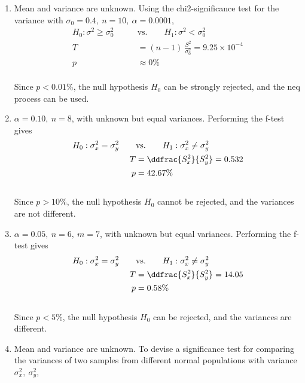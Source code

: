 \begin{enumerate}
	\item Mean and variance are unknown. Using the chi2-significance test for the variance with $ \sigma_0 = 0.4,\ n = 10,\ \alpha = 0.0001 $, \\
	
	\begin{align}
		H_0 : \sigma^2 \geq \sigma_0^2 \qquad &\text{vs.} \qquad H_1 : \sigma^2 < \sigma_0^2 \nonumber \\
		T &= (n-1)\ \frac{S^2}{\sigma_0^2} = 9.25\times 10^{-4}\nonumber \\
		p &\approx 0\% 
	\end{align} \\
	Since $ p < 0.01\% $, the null hypothesis $ H_0 $ can be strongly rejected, and the neq process can be used.\\

	\item $\alpha = 0.10,\ n = 8$, with unknown but equal variances. Performing the f-test gives\\
	
	\begin{align}
		H_0 : \sigma^2_x = \sigma^2_y \qquad &\text{vs.} \qquad H_1 : \sigma^2_x \neq \sigma^2_y \nonumber \\
		T &= \ddfrac{ S^2_x }{S^2_y} = 0.532 \nonumber \\
		p &= 42.67\% 
	\end{align}\\
	Since $ p > 10\% $, the null hypothesis $ H_0 $ cannot be rejected, and the variances are not different.\\
	
	\item $\alpha = 0.05,\ n = 6,\ m = 7$, with unknown but equal variances. Performing the f-test gives\\
	
	\begin{align}
		H_0 : \sigma^2_x = \sigma^2_y \qquad &\text{vs.} \qquad H_1 : \sigma^2_x \neq \sigma^2_y \nonumber \\
		T &= \ddfrac{ S^2_x }{S^2_y} = 14.05 \nonumber \\
		p &= 0.58\% 
	\end{align}\\
	Since $ p < 5\% $, the null hypothesis $ H_0 $ can be rejected, and the variances are different.\\
	
	\item Mean and variance are unknown. To devise a significance test for comparing the variances of two samples from different normal populations with variance $ \sigma^2_x,\ \sigma^2_y $, \\
	

\end{enumerate}
